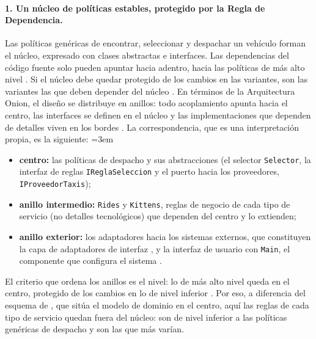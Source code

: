 \paragraph{1. Un núcleo de políticas estables, protegido por la Regla de Dependencia.}
Las políticas genéricas de encontrar, seleccionar y despachar un vehículo forman el
núcleo, expresado con clases abstractas e interfaces. Las dependencias del código fuente
solo pueden apuntar hacia adentro, hacia las políticas de más alto nivel
\parencite[203]{martin2017}. Si el núcleo debe quedar protegido de los cambios en las
variantes, son las variantes las que deben depender del núcleo
\parencite[73--74]{martin2017}. En términos de la Arquitectura Onion, el diseño se
distribuye en anillos: todo acoplamiento apunta hacia el centro, las interfaces se
definen en el núcleo y las implementaciones que dependen de detalles viven en los bordes
\parencite{palermo2008}. La correspondencia, que es una interpretación propia, es la
siguiente:
\begingroup\emergencystretch=3em
\begin{itemize}
  \item \textbf{centro:} las políticas de despacho y sus abstracciones (el selector
        \texttt{Selector}, la interfaz de reglas \texttt{IReglaSeleccion} y el puerto
        hacia los proveedores, \texttt{IProveedorTaxis});
  \item \textbf{anillo intermedio:} \texttt{Rides} y \texttt{Kittens}, reglas de negocio
        de cada tipo de servicio (no detalles tecnológicos) que dependen del centro y lo
        extienden;
  \item \textbf{anillo exterior:} los adaptadores hacia los sistemas externos, que
        constituyen la capa de adaptadores de interfaz \parencite[205]{martin2017}, y la
        interfaz de usuario con \texttt{Main}, el componente que configura el sistema
        \parencite[237]{martin2017}.
\end{itemize}
\endgroup
El criterio que ordena los anillos es el nivel: lo de más alto nivel queda en el centro,
protegido de los cambios en lo de nivel inferior \parencite[73--74]{martin2017}. Por eso,
a diferencia del esquema de \textcite{palermo2008}, que sitúa el modelo de dominio en el
centro, aquí las reglas de cada tipo de servicio quedan fuera del núcleo: son de nivel
inferior a las políticas genéricas de despacho y son las que más varían.

